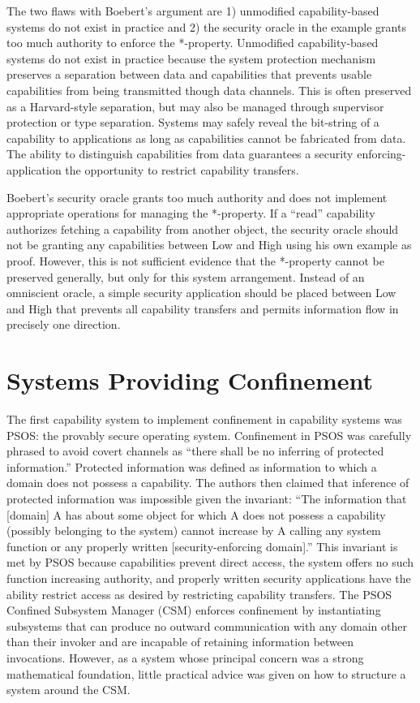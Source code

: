 The two flaws with Boebert's argument are 1) unmodified capability-based systems do not exist in practice and 2) the security oracle in the example grants too much authority to enforce the *-property.
Unmodified capability-based systems do not exist in practice because the system protection mechanism preserves a separation between data and capabilities that prevents usable capabilities from being transmitted though data channels.
This is often preserved as a Harvard-style separation, but may also be managed through supervisor protection or type separation.
Systems may safely reveal the bit-string of a capability to applications as long as capabilities cannot be fabricated from data.
The ability to distinguish capabilities from data guarantees a security enforcing-application the opportunity to restrict capability transfers.

Boebert's security oracle grants too much authority and does not implement appropriate operations for managing the *-property.
If a ``read'' capability authorizes fetching a capability from another object, the security oracle should not be granting any capabilities between Low and High using his own example as proof.
However, this is not sufficient evidence that the *-property cannot be preserved generally, but only for this system arrangement.
Instead of an omniscient oracle, a simple security application should be placed between Low and High that prevents all capability transfers and permits information flow in precisely one direction.

\section{Systems Providing Confinement}

The first capability system to implement confinement in capability systems was PSOS: the provably secure operating system. \cite{Feiertag79psos}
Confinement in PSOS was carefully phrased to avoid covert channels as ``there shall be no inferring of protected information.''
Protected information was defined as information to which a domain does not possess a capability.
The authors then claimed that inference of protected information was impossible given the invariant: ``The information that [domain] A has about some object for which A does not possess a capability (possibly belonging to the system) cannot increase by A calling any system function or any properly written [security-enforcing domain].''
This invariant is met by PSOS because capabilities prevent direct access, the system offers no such function increasing authority, and properly written security applications have the ability restrict access as desired by restricting capability transfers.
The PSOS Confined Subsystem Manager (CSM) enforces confinement by instantiating subsystems that can produce no outward communication with any domain other than their invoker and are incapable of retaining information between invocations.
However, as a system whose principal concern was a strong mathematical foundation, little practical advice was given on how to structure a system around the CSM.

